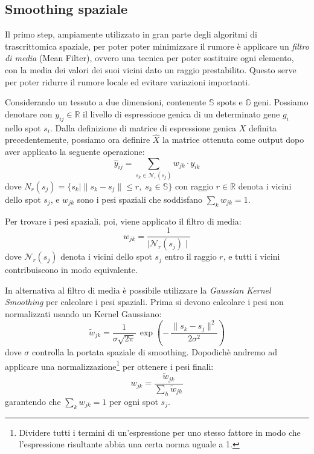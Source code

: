 \subsection{Smoothing spaziale}\label{subsec:SpatialSmoothing}

Il primo step, ampiamente utilizzato in gran parte degli algoritmi di trascrittomica spaziale\cite{Giotto,SpatialSmoothing1,SpatialSmoothing2}, per poter poter minimizzare il rumore è applicare un \textit{filtro di media} (Mean Filter),
ovvero una tecnica per poter sostituire ogni elemento, con la media dei valori dei suoi vicini dato un raggio prestabilito.
Questo serve per poter ridurre il rumore locale ed evitare variazioni importanti.

Considerando un tessuto a due dimensioni, contenente $\mathbb{S}$ spots e $\mathbb{G}$ geni.
Possiamo denotare con $y_{ij} \in \mathbb{R}$ il livello di espressione genica di un determinato gene $g_i$ nello spot $s_i$.
Dalla definizione di matrice di espressione genica $X$ definita precedentemente, possiamo ora definire $\widehat{X}$ la matrice ottenuta come output 
dopo aver applicato la seguente operazione:
\begin{equation}
\hat y_{ij} = \sum_{s_k \in \mathcal{N}_r(s_j)} w_{jk} \cdot y_{ik}
\label{eq:smoothing}
\end{equation}
dove $N_r(s_j) = \{ s_k \mid \| s_k - s_j \| \le r,\; s_k \in \mathbb{S} \}$ con raggio $r \in \mathbb{R}$ denota i vicini dello spot $s_j$, e $w_{jk}$ sono i pesi spaziali 
che soddisfano $\sum_k w_{jk} = 1$.

Per trovare i pesi spaziali, poi, viene applicato il filtro di media:
\begin{equation}
	w_{jk} = \frac{1}{\mid \mathcal{N}_r(s_j)\mid}
\label{eq:filtroDiMedia}
\end{equation}
dove $\mathcal{N}_r(s_j)$ denota i vicini dello spot $s_j$ entro il raggio $r$, e tutti i vicini contribuiscono in modo equivalente.

\medskip
\noindent
In alternativa al filtro di media è possibile utilizzare la \textit{Gaussian Kernel Smoothing}\cite{GaussianKernelSmoothing} 
per calcolare i pesi spaziali.
Prima si devono calcolare i pesi non normalizzati usando un Kernel Gaussiano:
\begin{equation}
	\widetilde w_{jk} = \frac{1}{\sigma\sqrt{2\pi}}\,
\exp\!\left(-\,\frac{\lVert s_k - s_j\rVert^{2}}{2\sigma^{2}}\right)
\label{eq:gaussianKernel}
\end{equation}
dove $\sigma$ controlla la portata spaziale di smoothing.
Dopodichè andremo ad applicare una normalizzazione\footnote{Dividere tutti i termini di un'espressione per uno stesso fattore in modo che l'espressione risultante abbia una certa norma uguale a 1.} per ottenere i pesi finali:
\begin{equation}
	w_{jk} = \frac{\widetilde{w}_{jk}}{\sum_h \widetilde{w}_{jh}}
\label{eq:gaussianKernelNormalization}
\end{equation}
garantendo che $\sum_k w_{jk} = 1$ per ogni spot $s_j$.

